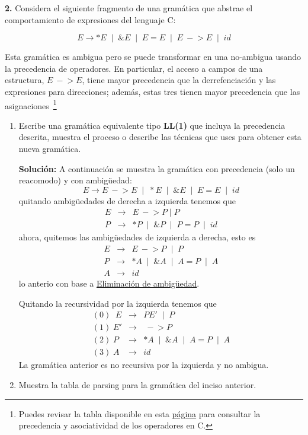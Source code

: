 \textbf{2.} Considera el siguiente fragmento de una gram\'atica que abstrae el 
comportamiento de expresiones del lenguaje \textsf{C}:

\[
E \to *E \;\mid\; \&E \;\mid\; E = E \;\mid\; E\ -\!> E \;\mid\; id
\]

Esta gram\'atica es ambigua pero se puede transformar en una no-ambigua usando
la precedencia de operadores.
En particular, el acceso a campos de una estructura, $E\ -\!> E$, tiene mayor 
precedencia que la derrefenciaci\'on y las expresiones para direcciones; 
adem\'as, estas tres tienen mayor precedencia que las 
asignaciones~\footnote{Puedes revisar la tabla disponible en esta 
\href{https://justdocodings.blogspot.com/2018/06/operator-precedence-and-associativity.html}{p\'agina} 
para consultar la precedencia y asociatividad de los operadores en \textsc{C}.}
\begin{enumerate}
\item Escribe una gram\'atica equivalente tipo \textbf{LL(1)} que incluya la
precedencia descrita, muestra el proceso o describe las técnicas que uses para 
obtener esta nueva gramática.

\textbf{Solución:} A continuación se muestra la gramática con precedencia (solo un reacomodo)
y con ambig\"uedad:
\[ E \to E\ -\!> E \;\mid\; *E \;\mid\; \&E \;\mid\; E = E \;\mid\; id\]
quitando ambig\"uedades de derecha a izquierda tenemos que
\begin{eqnarray*}
         E &\to& E\ -\!> P\; |\; P\\
         P &\to& *P \;\mid\; \&P \;\mid\; P = P \;\mid\; id
\end{eqnarray*}
ahora, quitemos las ambig\"uedades de izquierda a derecha, esto es
\begin{eqnarray*}
         E &\to& E\ -\!> P\;\mid\; P\\
         P &\to& *A \;\mid\; \&A \;\mid\; A = P \;\mid\; A \\
         A &\to& id
\end{eqnarray*}
lo anterio con base a \href{https://barcelonageeks.com/eliminacion-de-ambiguedad-conversion-de-una-gramatica-ambigua-en-gramatica-inequivoca/}{Eliminaci\'on de ambig\"uedad}.

Quitando la recursividad por la izquierda tenemos que
\begin{eqnarray*}
         (0)\;\; E &\to& PE' \;\mid\; P\\
         (1)\; E' &\to& \ -\!> P\\
         (2)\; P &\to& *A \;\mid\; \&A \;\mid\; A = P \;\mid\; A \\
         (3)\; A &\to& id
\end{eqnarray*}
La gramática anterior es no recursiva por la izquierda y no ambigua.
\item Muestra la tabla de parsing para la gram\'atica del inciso anterior.


\end{enumerate}
